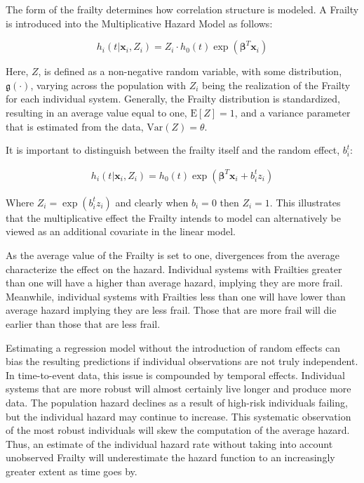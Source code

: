The form of the frailty determines how correlation structure is modeled. A Frailty is introduced into the Multiplicative Hazard Model as follows:

$$ h_i(t|\textbf{x}_i, Z_i) = Z_i \cdot h_0(t) \exp(\boldsymbol\beta^T \textbf{x}_i)  $$

Here, $Z$, is defined as a non-negative random variable, with some distribution, $\mathfrak{g}(\cdot)$, varying across the population\cite{Wienke2010} with $Z_i$ being the realization of the Frailty for each individual system. Generally, the Frailty distribution is standardized, resulting in an average value equal to one, $\mathrm{E}[Z] = 1$, and a variance parameter that is estimated from the data, $\text{Var}(Z) = \theta$.

It is important to distinguish between the frailty itself and the random effect, $b_i^t$:  

\begin{align*}
h_i(t|\textbf{x}_i, Z_{i}) = h_0(t) \exp(\boldsymbol\beta^T \textbf{x}_i + b_i^t z_i)
\end{align*}

Where $Z_{i} = \exp(b_i^t z_{i})$ and clearly when $b_i = 0$ then $Z_i = 1$. This illustrates that the multiplicative effect the Frailty intends to model can alternatively be viewed as an additional covariate in the linear model. 


As the average value of the Frailty is set to one, divergences from the average characterize the effect on the hazard. Individual systems with Frailties greater than one will have a higher than average hazard, implying they are more frail. Meanwhile, individual systems with Frailties less than one will have lower than average hazard implying they are less frail. Those that are more frail will die earlier than those that are less frail.

Estimating a regression model without the introduction of random effects can bias the resulting predictions if individual observations are not truly independent. In time-to-event data, this issue is compounded by temporal effects. Individual systems that are more robust will almost certainly live longer and produce more data. The population hazard declines as a result of high-risk individuals failing, but the individual hazard may continue to increase. This systematic observation of the most robust individuals will skew the computation of the average hazard. Thus, an estimate of the individual hazard rate without taking into account unobserved Frailty will underestimate the hazard function to an increasingly greater extent as time goes by\cite{Aalen2008}.

